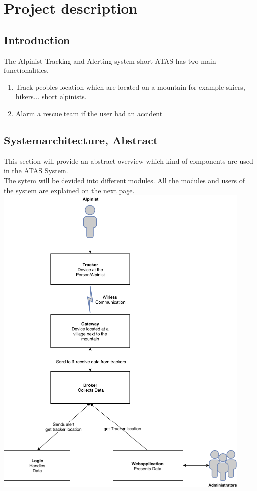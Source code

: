\documentclass[a4paper,11pt, oneside]{report}
\theoremstyle{definition}
\begin{document}
\chapter{Project description}

\section{Introduction}
The Alpinist Tracking and Alerting system short ATAS has two main functionalities.
\begin{enumerate}
\item Track peobles location which are located on a mountain for example skiers, hikers... short alpinists.
\item Alarm a rescue team if the user had an accident
\end{enumerate}


\newpage
\section{Systemarchitecture, Abstract}
This section will provide an abstract overview which kind of components are used in the ATAS System.\\
The sytem will be devided into different modules. All the modules and users of the system are explained on the next page.\\

\includegraphics[width=0.93\textwidth]{img/ATAS_SystemOverview_Abstract.png}
\end{document}
